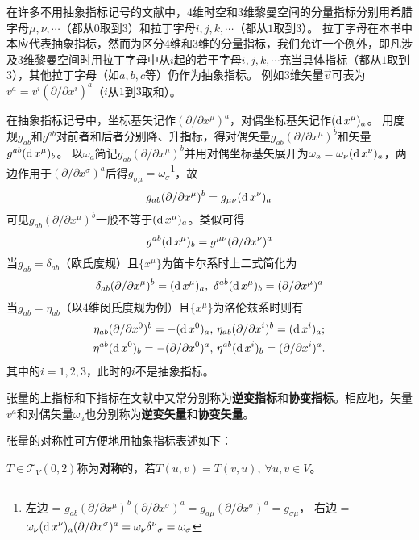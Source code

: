 在许多不用抽象指标记号的文献中，$4$维时空和$3$维黎曼空间的分量指标分别用希腊字母$\mu, \nu, \cdots$（都从$0$取到$3$）和拉丁字母$i, j, k, \cdots$（都从$1$取到$3$）。
拉丁字母在本书中本应代表抽象指标，然而为区分$4$维和$3$维的分量指标，我们允许一个例外，即凡涉及$3$维黎曼空间时用拉丁字母中从$i$起的若干字母$i, j, k, \cdots$充当具体指标（都从$1$取到$3$），其他拉丁字母（如$a, b, c$等）仍作为抽象指标。
例如$3$维矢量$\vec{v}$可表为$v^a = v^i(\partial / \partial x^i)^a$（$i$从$1$到$3$取和）。

在抽象指标记号中，坐标基矢记作$(\partial / \partial x^\mu)^a$，对偶坐标基矢记作$(\operatorname{d} x^\mu)_a$。
用度规$g_{ab}$和$g^{ab}$对前者和后者分别降、升指标，得对偶矢量$g_{ab}(\partial / \partial x^\mu)^b$和矢量$g^{ab}(\operatorname{d} x^\mu)_b$。
以$\omega_a$简记$g_{ab}(\partial / \partial x^\mu)^b$并用对偶坐标基矢展开为$\omega_a = \omega_\nu(\operatorname{d} x^\nu)_a$，两边作用于$(\partial / \partial x^\sigma)^a$后得$g_{\sigma\mu} = \omega_\sigma$\footnote{
左边 = $g_{ab}(\partial / \partial x^\mu)^b(\partial / \partial x^\sigma)^a = g_{a\mu}(\partial / \partial x^\sigma)^a = g_{\sigma\mu}$，
右边 = $\omega_\nu(\operatorname{d} x^\nu)_a(\partial / \partial x^\sigma)^a = \omega_\nu\delta^\nu{}_\sigma = \omega_\sigma$
}，故
$$g_{ab}(\partial / \partial x^\mu)^b = g_{\mu\nu}(\operatorname{d} x^\nu)_a$$
可见$g_{ab}(\partial / \partial x^\mu)^b$一般不等于$(\operatorname{d} x^\mu)_a$。类似可得
$$g^{ab}(\operatorname{d} x^\mu)_b = g^{\mu\nu}(\partial / \partial x^\nu)^a$$
当$g_{ab} = \delta_{ab}$（欧氏度规）且$\{x^\mu\}$为笛卡尔系时上二式简化为
$$\delta_{ab}(\partial / \partial x^\mu)^b = (\operatorname{d} x^\mu)_a, ~ \delta^{ab}(\operatorname{d} x^\mu)_b = (\partial / \partial x^\mu)^a$$
当$g_{ab} = \eta_{ab}$（以$4$维闵氏度规为例）且$\{x^\mu\}$为洛伦兹系时则有
$$\begin{aligned}
\eta_{ab}(\partial / \partial x^0)^b = -(\operatorname{d} x^0)_a, ~ & \eta_{ab}(\partial / \partial x^i)^b = (\operatorname{d} x^i)_a; \\
\eta^{ab}(\operatorname{d} x^0)_b = -(\partial / \partial x^0)^a, ~ & \eta^{ab}(\operatorname{d} x^i)_b = (\partial / \partial x^i)^a.
\end{aligned}$$
其中的$i = 1, 2, 3$，此时的$i$不是抽象指标。

张量的上指标和下指标在文献中又常分别称为\textbf{逆变指标}和\textbf{协变指标}。相应地，矢量$v^a$和对偶矢量$\omega_a$也分别称为\textbf{逆变矢量}和\textbf{协变矢量}。

张量的对称性可方便地用抽象指标表述如下：

\begin{definition}
$T \in \mathscr{T}_V(0, 2)$称为\textbf{对称}的，若$T(u, v) = T(v, u), ~ \forall u, v \in V$。
\end{definition}


